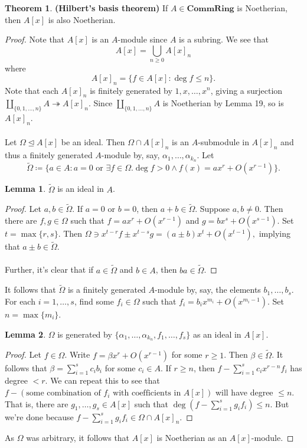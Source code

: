 \documentclass[10pt,letterpaper,cm]{nupset}
\theoremstyle{definition}
\newtheorem{theorem}{Theorem}
\newtheorem{lemma}{Lemma}
\newcommand{\1}{\mathbf{1}}
\newcommand{\0}{\vec 0}
\begin{document}
\begin{theorem}{\textbf{(Hilbert's basis theorem)}} 
If $A\in \mathbf{CommRing}$ is Noetherian, then $A[x]$ is also Noetherian. 
\end{theorem}
\begin{proof}
Note that $A[x]$ is an $A$-module since $A$ is a subring. We see that $$A[x] = \bigcup_{n\geq 0} A[x]_n$$ where $$A[x]_n =  \{f \in A[x] : \deg f \leq n\}  .$$
Note that each $A[x]_n$ is finitely generated by $1, x, \ldots, x^n$, giving a surjection $\coprod_{\{0, 1, \ldots, n\}}A \twoheadrightarrow A[x]_n$. Since $\coprod_{\{0, 1, \ldots, n\}}A$ is Noetherian by Lemma 19, so is $A[x]_n$.
\\ \\ Let $\Omega \unlhd A[x]$ be an ideal. Then $\Omega \cap A[x]_n$ is an $A$-submodule in $A[x]_n$ and thus a finitely generated $A$-module by, say, $\alpha_1, \ldots, \alpha_{k_n}$. Let $$\widetilde{\Omega} \coloneqq  \{a\in A : a = 0 \text{ or } \exists f\in \Omega. \deg f >0 \land f(x) = ax^r+ O(x^{r-1})\}.$$
\begin{lemma}
$\widetilde{\Omega}$ is an ideal in $A$.
\end{lemma}
\begin{proof}
Let $a,b \in \widetilde{\Omega}$. If $a=0$ or $b=0$, then $a+b\in \widetilde{\Omega}$. Suppose $a,b\ne 0$. Then there are $f, g \in 
\Omega$ such that $f= ax^r + O(x^{r-1})$ and $g= bx^s + O(x^{s-1})$. Set $t=\max\{r, s\}$. Then ${\Omega} \ni x^{t-r}f \pm x^{t-s}g = (a\pm b)x^t +O(x^{t-1}),$ implying that $a\pm b \in \widetilde{\Omega}$.
\\ \\
Further, it's clear that if $a\in \widetilde{\Omega}$ and $b\in A$, then $ba\in \widetilde{\Omega}$. 
\end{proof}
It follows that $\widetilde{\Omega}$ is a finitely generated $A$-module by, say, the elements $b_1, \ldots, b_s$. For each $i=1, \ldots, s$, find some $f_i \in \Omega$ such that $f_i = b_ix^{m_i} + O(x^{m_i-1})$. Set $n= \max\{m_i\}$.
\begin{lemma}
$\Omega$ is generated by $\{\alpha_1, \ldots, \alpha_{k_n}, f_1, \ldots, f_s\}$ as an ideal in $A[x]$.
\end{lemma}
\begin{proof}
Let $f\in \Omega$. Write $f = \beta x^r + O(x^{r-1})$ for some $r \geq 1$. Then $\beta \in \widetilde{\Omega}$. It follows that $\beta = \sum_{i=1}^s c_ib_i$ for some $c_i \in A$. If $r \geq n$, then $f -\sum_{i=1}^s c_ix^{r-n}f_i$ has degree $< r$. We can repeat this to see that $f - (\text{some combination of } f_i \text{ with coefficients in } A[x])$ will have degree $\leq n$. That is, there are $g_1, \ldots, g_s \in A[x]$ such that $\deg(f - \sum_{i=1}^sg_if_i) \leq n$. But we're done because $f - \sum_{i=1}^sg_if_i \in \Omega \cap A[x]_n$.
\end{proof}
As $\Omega$ was arbitrary, it follows that $A[x]$ is Noetherian as an $A[x]$-module. 
\end{proof}
\end{document}
